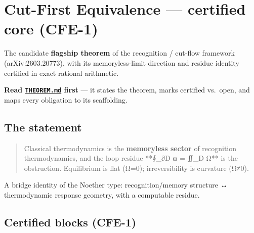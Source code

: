 \hypertarget{cut-first-equivalence-certified-core-cfe-1}{%
\chapter{Cut-First Equivalence --- certified core (CFE-1)}\label{cut-first-equivalence-certified-core-cfe-1}}

The candidate \textbf{flagship theorem} of the recognition / cut-flow
framework (arXiv:2603.20773), with its memoryless-limit direction and
residue identity certified in exact rational arithmetic.

\textbf{Read \href{THEOREM.md}{\texttt{THEOREM.md}} first} --- it states the theorem, marks
certified vs.~open, and maps every obligation to its scaffolding.

\hypertarget{the-statement}{%
\section{The statement}\label{the-statement}}

\begin{quote}
Classical thermodynamics is the \textbf{memoryless sector} of recognition
thermodynamics, and the loop residue **∮\_∂D ω = ∬\_D Ω** is the
obstruction. Equilibrium is flat (Ω=0); irreversibility is curvature
(Ω≠0).
\end{quote}

A bridge identity of the Noether type: recognition/memory structure ↔
thermodynamic response geometry, with a computable residue.

\hypertarget{certified-blocks-cfe-1}{%
\section{Certified blocks (CFE-1)}\label{certified-blocks-cfe-1}}

